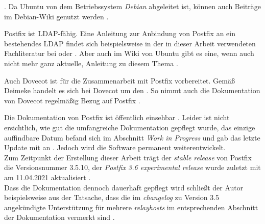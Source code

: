  \citep[][]{ubuntupostfix}. Da Ubuntu von dem Betriebssystem \textit{Debian} abgeleitet ist, können auch Beiträge im Debian-Wiki genutzt werden \citep[vgl.][]{debianpostfix}. 

Postfix ist LDAP-fähig.
Eine Anleitung zur Anbindung von Postfix an ein bestehendes LDAP findet sich beispielsweise in der in dieser Arbeit verwendeten Fachliteratur bei \cite[S. 689 ff.]{Deimeke2019} oder \cite[S. 106 f.]{Heinlein2004}. Aber auch im Wiki von Ubuntu gibt es eine, wenn auch nicht mehr ganz aktuelle, Anleitung zu diesem Thema \citep[vgl.][]{ubuntudovecotLDAPwiki}.

Auch Dovecot ist für die Zusammenarbeit mit Postfix vorbereitet. 
Gemäß Deimeke handelt es sich bei Dovecot um den  \citep[][338]{Deimeke2019}. 
So nimmt auch die Dokumentation von Dovecot regelmäßig Bezug auf Postfix \citep[vgl. z.B.][]{DovecotPostfix}.

Die Dokumentation von Postfix ist öffentlich einsehbar \citep[vgl.][]{postfixdoku}. Leider ist nicht ersichtlich, wie gut die umfangreiche Dokumentation gepflegt wurde, das einzige auffindbare Datum befand sich im Abschnitt \textit{Work in Progress} und gab das letzte Update mit  an \citep[vgl.][]{postfixwip}. Jedoch wird die Software permanent weiterentwickelt. \\
Zum Zeitpunkt der Erstellung dieser Arbeit trägt der \textit{stable release} von Postfix die Versionsnummer 3.5.10, der \textit{Postfix 3.6 experimental release} wurde zuletzt mit am 11.04.2021 aktualisiert \citep[vgl.][]{postfixsource}. \\
Dass die Dokumentation dennoch dauerhaft gepflegt wird schließt der Autor beispielsweise aus der Tatsache, dass die im \textit{changelog} zu Version 3.5 angekündigte Unterstützung für mehrere \textit{relayhosts} \citep[vgl.][]{postfixcl35} im entsprechenden Abschnitt der Dokumentation vermerkt sind \citep[vgl.][]{postfixrelayhost}.

